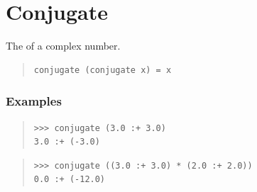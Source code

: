\section{Conjugate}
\begin{haddockdesc}
\item[\begin{tabular}{@{}l}
conjugate :: Num a => Complex a -> Complex a
\end{tabular}]
{\haddockbegindoc
The  of a complex number.\par
\begin{quote}
{\haddockverb\begin{verbatim}
conjugate (conjugate x) = x\end{verbatim}}
\end{quote}
\subsubsection*{\textbf{Examples}}
\begin{quote}
{\haddockverb\begin{verbatim}
>>> conjugate (3.0 :+ 3.0)
3.0 :+ (-3.0)

\end{verbatim}}
\end{quote}
\begin{quote}
{\haddockverb\begin{verbatim}
>>> conjugate ((3.0 :+ 3.0) * (2.0 :+ 2.0))
0.0 :+ (-12.0)

\end{verbatim}}
\end{quote}}
\end{haddockdesc}